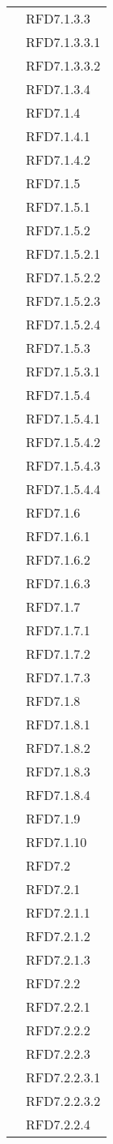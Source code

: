 \begin{longtable}{|>{\centering}m{10cm}|m{3cm}<{\centering}|}
& RFD7.1.3.3\\
& RFD7.1.3.3.1\\
& RFD7.1.3.3.2\\
& RFD7.1.3.4\\
& RFD7.1.4\\
& RFD7.1.4.1\\
& RFD7.1.4.2\\
& RFD7.1.5\\
& RFD7.1.5.1\\
& RFD7.1.5.2\\
& RFD7.1.5.2.1\\
& RFD7.1.5.2.2\\
& RFD7.1.5.2.3\\
& RFD7.1.5.2.4\\
& RFD7.1.5.3\\
& RFD7.1.5.3.1\\
& RFD7.1.5.4\\
& RFD7.1.5.4.1\\
& RFD7.1.5.4.2\\
& RFD7.1.5.4.3\\
& RFD7.1.5.4.4\\
& RFD7.1.6\\
& RFD7.1.6.1\\
& RFD7.1.6.2\\
& RFD7.1.6.3\\
& RFD7.1.7\\
& RFD7.1.7.1\\
& RFD7.1.7.2\\
& RFD7.1.7.3\\
& RFD7.1.8\\
& RFD7.1.8.1\\
& RFD7.1.8.2\\
& RFD7.1.8.3\\
& RFD7.1.8.4\\
& RFD7.1.9\\
& RFD7.1.10\\
& RFD7.2\\
& RFD7.2.1\\
& RFD7.2.1.1\\
& RFD7.2.1.2\\
& RFD7.2.1.3\\
& RFD7.2.2\\
& RFD7.2.2.1\\
& RFD7.2.2.2\\
& RFD7.2.2.3\\
& RFD7.2.2.3.1\\
& RFD7.2.2.3.2\\
& RFD7.2.2.4\\

\end{longtable}
